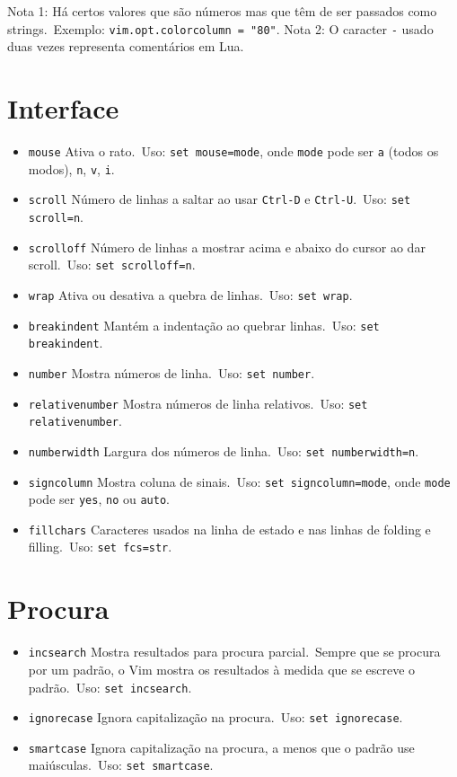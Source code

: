 Nota 1: Há certos valores que são números mas que têm de ser passados como strings.\ Exemplo: \texttt{vim.opt.colorcolumn = "80"}.
Nota 2: O caracter \texttt{-} usado duas vezes representa comentários em Lua.

\section{Interface}

\begin{itemize}
    \item \texttt{mouse} Ativa o rato.\ Uso: \texttt{set mouse=mode}, onde \texttt{mode} pode ser \texttt{a} (todos os modos), \texttt{n}, \texttt{v}, \texttt{i}.
    \item \texttt{scroll} Número de linhas a saltar ao usar \texttt{Ctrl-D} e \texttt{Ctrl-U}.\ Uso: \texttt{set scroll=n}.
    \item \texttt{scrolloff} Número de linhas a mostrar acima e abaixo do cursor ao dar scroll.\ Uso: \texttt{set scrolloff=n}.
    \item \texttt{wrap} Ativa ou desativa a quebra de linhas.\ Uso: \texttt{set wrap}.
    \item \texttt{breakindent} Mantém a indentação ao quebrar linhas.\ Uso: \texttt{set breakindent}.
    \item \texttt{number} Mostra números de linha.\ Uso: \texttt{set number}.
    \item \texttt{relativenumber} Mostra números de linha relativos.\ Uso: \texttt{set relativenumber}.
    \item \texttt{numberwidth} Largura dos números de linha.\ Uso: \texttt{set numberwidth=n}.
    \item \texttt{signcolumn} Mostra coluna de sinais.\ Uso: \texttt{set signcolumn=mode}, onde \texttt{mode} pode ser \texttt{yes}, \texttt{no} ou \texttt{auto}.
    \item \texttt{fillchars} Caracteres usados na linha de estado e nas linhas de folding e filling.\ Uso: \texttt{set fcs=str}.
\end{itemize}

\section{Procura}

\begin{itemize}
    \item \texttt{incsearch} Mostra resultados para procura parcial.\ Sempre que se procura por um padrão, o Vim mostra os resultados à medida que se escreve o padrão.\ Uso: \texttt{set incsearch}.
    \item \texttt{ignorecase} Ignora capitalização na procura.\ Uso: \texttt{set ignorecase}.
    \item \texttt{smartcase} Ignora capitalização na procura, a menos que o padrão use maiúsculas.\ Uso: \texttt{set smartcase}.
\end{itemize}

